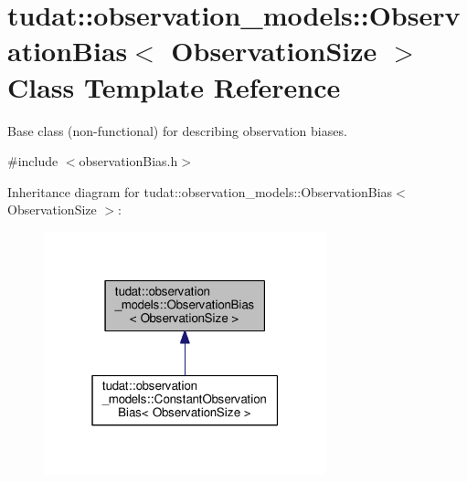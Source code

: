 \hypertarget{classtudat_1_1observation__models_1_1ObservationBias}{}\section{tudat\+:\+:observation\+\_\+models\+:\+:Observation\+Bias$<$ Observation\+Size $>$ Class Template Reference}
\label{classtudat_1_1observation__models_1_1ObservationBias}


Base class (non-\/functional) for describing observation biases.  




{\ttfamily \#include $<$observation\+Bias.\+h$>$}



Inheritance diagram for tudat\+:\+:observation\+\_\+models\+:\+:Observation\+Bias$<$ Observation\+Size $>$\+:
\nopagebreak
\begin{figure}[H]
\begin{center}
\leavevmode
\includegraphics[width=232pt]{classtudat_1_1observation__models_1_1ObservationBias__inherit__graph}
\end{center}
\end{figure}

